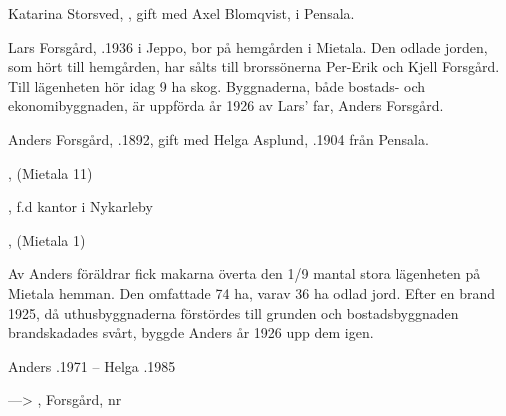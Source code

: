 Katarina Storsved, , gift med Axel Blomqvist,  i Pensala.
\begin{jhchildren}
  \item {}
  \item {}
  \item {}
  \item {}
\end{jhchildren}






Lars Forsgård, .1936 i Jeppo, bor på hemgården i Mietala. Den odlade jorden, som hört till hemgården, har sålts till brorssönerna Per-Erik och Kjell Forsgård. Till lägenheten hör idag 9 ha skog. Byggnaderna, både bostads- och ekonomibyggnaden, är uppförda år 1926 av Lars' far, Anders Forsgård.


Anders Forsgård, .1892, gift med Helga Asplund, .1904 från Pensala.
\begin{jhchildren}
  \item {}, (Mietala 11)
  \item {}, f.d kantor i Nykarleby
  \item {}, (Mietala  1)
  \item {}
  \item {}
\end{jhchildren}

Av Anders föräldrar fick makarna överta den 1/9 mantal stora lägenheten på Mietala hemman. Den omfattade 74 ha, varav 36 ha odlad jord. Efter en brand 1925, då uthusbyggnaderna förstördes till grunden och  bostadsbyggnaden  brandskadades svårt, byggde Anders år 1926 upp dem igen.

Anders .1971  --  Helga .1985




---> , Forsgård,  nr 


